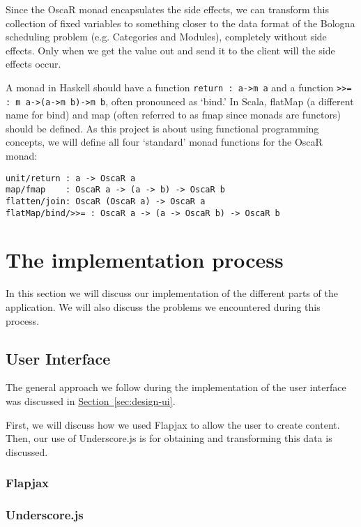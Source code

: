 \documentclass[a4paper]{article}
\begin{document}
Since the OscaR monad encapsulates the side effects,
we can transform this collection of fixed variables to something closer to the
data format of the Bologna scheduling problem (e.g. Categories and Modules),
completely without side effects.
Only when we get the value out and send it to the client will the side effects occur.

A monad in Haskell should have a function \verb|return : a->m a| and a function
 \verb|>>= : m a->(a->m b)->m b|, often pronounced as `bind.'
In Scala, flatMap (a different name for bind) and 
map (often referred to as fmap since monads are functors) should be defined.
As this project is about using functional programming concepts, 
we will define all four `standard' monad functions for the OscaR monad:
\begin{verbatim}
unit/return : a -> OscaR a
map/fmap	: OscaR a -> (a -> b) -> OscaR b
flatten/join: OscaR (OscaR a) -> OscaR a
flatMap/bind/>>= : OscaR a -> (a -> OscaR b) -> OscaR b
\end{verbatim}

\newpage

\section{The implementation process}
\label{sec:impl}
In this section we will discuss our implementation of the different parts
of the application.
We will also discuss the problems we encountered during this process.

\subsection{User Interface}
The general approach we follow during the implementation of the user interface
was discussed in
\hyperref[sec:design-ui]{Section~\ref*{sec:design-ui}}.

First, we will discuss how we used Flapjax to allow the user to create content.
Then, our use of Underscore.js is for obtaining and transforming this data
is discussed.
\subsubsection{Flapjax}


\subsubsection{Underscore.js}
\end{document}
